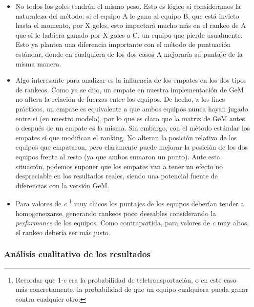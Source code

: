 \begin{itemize}
	\item No todos los goles tendrán el mismo peso. Esto es lógico si consideramos la naturaleza del método: si el equipo A le gana al equipo B, que está invicto hasta el momento, por X goles, esto impactará mucho más en el rankeo de A que si le hubiera ganado por X goles a C, un equipo que pierde usualmente. Esto ya plantea una diferencia importante con el método de puntuación estándar, donde en cualquiera de los dos casos A mejoraría su puntaje de la misma manera.

	\item Algo interesante para analizar es la influencia de los empates en los dos tipos de rankeos. Como ya se dijo, un empate en nuestra implementación de GeM no altera la relación de fuerzas entre los equipos. De hecho, a los fines prácticos, un empate es equivalente a que ambos equipos nunca hayan jugado entre sí (en nuestro modelo), por lo que es claro que la matriz de GeM antes o después de un empate es la misma. Sin embargo, con el método estándar los empates sí que modifican el ranking. No alteran la posición relativa de los equipos que empataron, pero claramente puede mejorar la posición de los dos equipos frente al resto (ya que ambos sumaron un punto). Ante esta situación, podemos suponer que los empates van a tener un efecto no despreciable en los resultados reales, siendo una potencial fuente de diferencias con la versión GeM.

	\item Para valores de \emph{c} \footnote{Recordar que 1-\emph{c} era la probabilidad de teletransportación, o en este caso más concretamente, la probabilidad de que un equipo cualquiera pueda ganar contra cualquier otro.} muy chicos los puntajes de los equipos deberían tender a homogeneizarse, generando rankeos poco deseables considerando la \emph{performance} de los equipos. Como contrapartida, para valores de \emph{c} muy altos, el rankeo debería ser más justo.
\end{itemize}


\subsubsection{Análisis cualitativo de los resultados}

